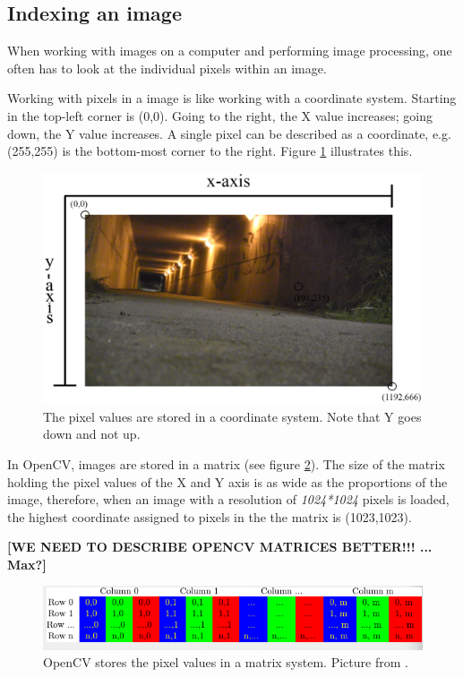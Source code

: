 \subsection{Indexing an image}
When working with images on a computer and performing image processing, one often has to look at the individual pixels within an image.

Working with pixels in a image is like working with a coordinate system. Starting in the top-left corner is (0,0). Going to the right, the X value increases; going down, the Y value increases. A single pixel can be described as a coordinate, e.g. (255,255) is the bottom-most corner to the right. Figure \ref{fig:ip_IndexingAPicture} illustrates this.

\begin{figure}[htbp]
\centering
\includegraphics[width=1.00\textwidth]{Pictures/Theory/IndexingAPicture}
\caption{The pixel values are stored in a coordinate system. Note that Y goes down and not up.}
\label{fig:ip_IndexingAPicture}
\end{figure} 

In OpenCV, images are stored in a matrix (see figure \ref{fig:opencv_matrix}). The size of the matrix holding the pixel values of the X and Y axis is as wide as the proportions of the image, therefore, when an image with a resolution of \textit{1024*1024} pixels is loaded, the highest coordinate assigned to pixels in the the matrix is (1023,1023).

\textbf{[WE NEED TO DESCRIBE OPENCV MATRICES BETTER!!! ... Max?]}

\begin{figure}[htbp]
\centering
\includegraphics[width=1.00\textwidth]{Pictures/Theory/opencv_matrix}
\caption{OpenCV stores the pixel values in a matrix system. Picture from \citep{opencv}.}
\label{fig:opencv_matrix}
\end{figure} 

